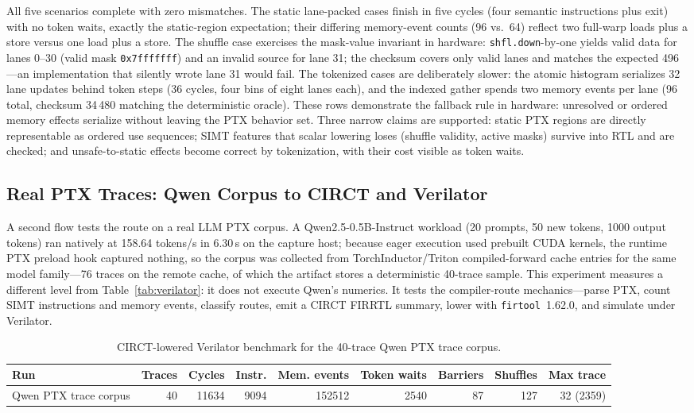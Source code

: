 \documentclass[sigplan,nonacm]{acmart}
\begin{document}
All five scenarios complete with zero mismatches.  The static lane-packed
cases finish in five cycles (four semantic instructions plus exit) with no
token waits, exactly the static-region expectation; their differing
memory-event counts (96 vs.\ 64) reflect two full-warp loads plus a store
versus one load plus a store.  The shuffle case exercises the mask-value
invariant in hardware: \texttt{shfl.down}-by-one yields valid data for
lanes 0--30 (valid mask \texttt{0x7fffffff}) and an invalid source for lane
31; the checksum covers only valid lanes and matches the expected 496---an
implementation that silently wrote lane 31 would fail.  The tokenized cases
are deliberately slower: the atomic histogram serializes 32 lane updates
behind token steps (36 cycles, four bins of eight lanes each), and the
indexed gather spends two memory events per lane (96 total, checksum
34\,480 matching the deterministic oracle).  These rows demonstrate the
fallback rule in hardware: unresolved or ordered memory effects serialize
without leaving the PTX behavior set.  Three narrow claims are supported:
static PTX regions are directly representable as ordered use sequences;
SIMT features that scalar lowering loses (shuffle validity, active masks)
survive into RTL and are checked; and unsafe-to-static effects become
correct by tokenization, with their cost visible as token waits.

\subsection{Real PTX Traces: Qwen Corpus to CIRCT and Verilator}
\label{sec:eval-qwen}

A second flow tests the route on a real LLM PTX corpus.  A
Qwen2.5-0.5B-Instruct workload (20 prompts, 50 new tokens, 1000 output
tokens) ran natively at 158.64 tokens/s in 6.30\,s on the capture host;
because eager execution used prebuilt CUDA kernels, the runtime PTX preload
hook captured nothing, so the corpus was collected from
TorchInductor/Triton compiled-forward cache entries for the same model
family---76 traces on the remote cache, of which the artifact stores a
deterministic 40-trace sample.  This experiment measures a different level
from Table~\ref{tab:verilator}: it does not execute Qwen's numerics.  It
tests the compiler-route mechanics---parse PTX, count SIMT instructions and
memory events, classify routes, emit a CIRCT FIRRTL summary, lower with
\texttt{firtool}~1.62.0, and simulate under Verilator.

\begin{table}[t]
\centering
\caption{CIRCT-lowered Verilator benchmark for the 40-trace Qwen PTX trace corpus.}
\label{tab:qwen-trace-verilator}
\small
\begin{tabular}{lrrrrrrrr}
\toprule
Run & Traces & Cycles & Instr. & Mem. events & Token waits & Barriers & Shuffles & Max trace \\
\midrule
Qwen PTX trace corpus & 40 & 11634 & 9094 & 152512 & 2540 & 87 & 127 & 32 (2359) \\
\bottomrule
\end{tabular}
\end{table}
\end{document}
